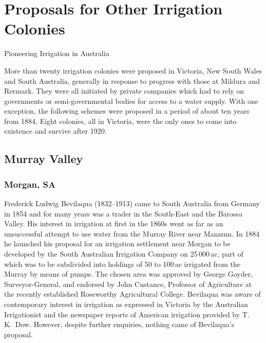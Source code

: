
\setcounter{endnote}{0}

\chapter{Proposals for Other Irrigation Colonies}
\label{ch:proposals}
%
{Pioneering Irrigation in Australia}

More than twenty irrigation colonies were proposed in Victoria, New
South Wales and South Australia, generally in response to progress
with those at Mildura and Rermark.  They were all initiated by private
companies which had to rely on governments or semi-governmental bodies
for access to a water supply. With one exception, the following
schemes were proposed in a period of about ten years from 1884.  Eight
colonies, all in Victoria, were the only ones to come into existence
and survive after 1920.

\section*{Murray Valley}

\subsection*{Morgan, SA} 

Frederick Ludwig Bevilaqua (1832--1913)  came
to South Australia from Germany in 1854 and for many years was a
trader in the South-East and the Barossa
Valley.  His interest in irrigation at first in
the 1860s went as far as an unsuccessful attempt to use water from the
Murray River  near Mannum.  In 1884
he launched his proposal for an irrigation settlement near Morgan to
be developed by the South Australian Irrigation Company  on 25\,000\,ac, part of which was to be subdivided
into holdings of 50 to 100\,ac irrigated from the Murray by means of
pumps.  The chosen area was approved by George Goyder,
Surveyor-General,   and endorsed by John Custance,
 Professor of Agriculture at the recently
established Roseworthy Agricultural College.  Bevilaqua was aware of contemporary interest
in irrigation as expressed in Victoria by the Australian Irrigationist
and the newspaper reports of American irrigation provided by
T.\,K.~Dow.  However, despite further enquiries,
nothing came of Bevilaqua's proposal.

